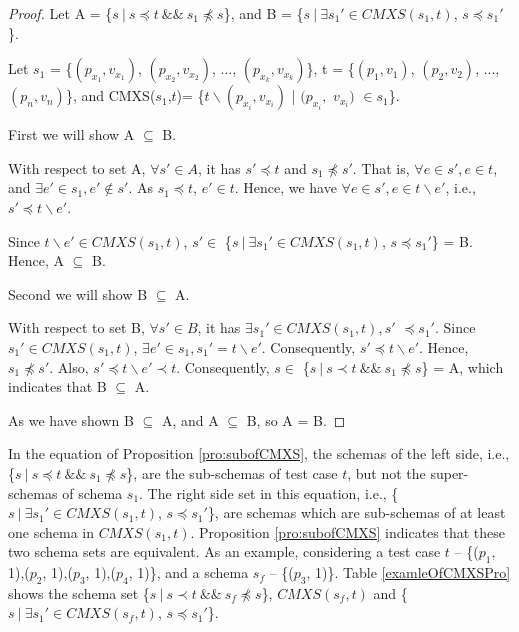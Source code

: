 \begin{proof}

Let A =  \{$s\ |\ s \preceq t\ \&\&\ s_{1} \npreceq s$\}, and B = \{$ s\ |\ \exists s_{1}' \in CMXS(s_{1}, t)$, $s \preceq s_{1}'$\}.



Let $s_{1}$ = \{$(p_{x_{1}}, v_{x_{1}})$, $(p_{x_{2}}, v_{x_{2}})$, ..., $(p_{x_{k}}, v_{x_{k}})$\},  t = \{$(p_{1}, v_{1})$, $(p_{2}, v_{2})$, ..., $(p_{n}, v_{n})$\}, and CMXS($s_{1}$,$t$)= \{$t \backslash (p_{x_{i}}, v_{x_{i}})$ | $(p_{x_{i}},$ $v_{x_{i}})$ $ \in s_{1} $\}.

First we will show A $\subseteq$ B.

With respect to set A, $\forall s' \in A$, it has $s' \preceq t$ and $ s_{1} \npreceq s'$. That is, $\forall e \in s', e \in t$, and  $\exists e' \in s_{1}, e' \not\in s'$. As $s_{1} \preceq t$, $e' \in t$. Hence, we have $\forall e \in s', e \in t \backslash e'$, i.e., $s' \preceq t \backslash e'$.

Since $t \backslash e' \in CMXS(s_{1}, t)$,  $s' \in $ \{$ s\ |\ \exists s_{1}' \in CMXS(s_{1}, t)$, $s \preceq s_{1}'$\} = B. Hence, A $\subseteq$ B.

Second we will show B $\subseteq$ A.

With respect to set B, $\forall s' \in B$, it has $\exists s_{1}' \in CMXS(s_{1}, t), s'$ $ \preceq s_{1}'$. Since $s_{1}' \in CMXS(s_{1}, t)$, $\exists e' \in s_{1}, s_{1}' =  t \backslash e'$. Consequently, $s' \preceq t \backslash e'$. Hence, $s_{1} \npreceq s'$. Also, $s' \preceq t \backslash e' \prec t$. Consequently, $s \in $  \{$s\ |\ s \prec t\ \&\&\ s_{1} \npreceq s$\} = A, which indicates that B $\subseteq$ A.

As we have shown B $\subseteq$ A, and A $\subseteq$ B, so A = B.

\end{proof}


In the equation of Proposition \ref{pro:subofCMXS}, the schemas of the left side, i.e., \{$s\ |\ s \preceq t\ \&\&\ s_{1} \npreceq s$\}, are the sub-schemas of test case $t$, but not the super-schemas of  schema $s_{1}$.  The right side set in this equation, i.e., \{$ s\ |\ \exists s_{1}' \in CMXS(s_{1}, t)$, $s \preceq s_{1}'$\}, are schemas which are sub-schemas of at least one schema in $CMXS(s_{1}, t)$. Proposition \ref{pro:subofCMXS} indicates that these two schema sets are equivalent. As an example, considering a test case $t$ -- \{($p_{1}$, 1),($p_{2}$, 1),($p_{3}$, 1),($p_{4}$, 1)\}, and a schema $s_{f}$ --  \{($p_{3}$, 1)\}. Table \ref{examleOfCMXSPro} shows the schema set  \{$s\ |\ s \prec t\ \&\&\ s_{f} \npreceq s$\}, $CMXS(s_{f}, t)$ and \{$ s\ |\ \exists s_{1}' \in CMXS(s_{f}, t)$, $s \preceq s_{1}'$\}.

